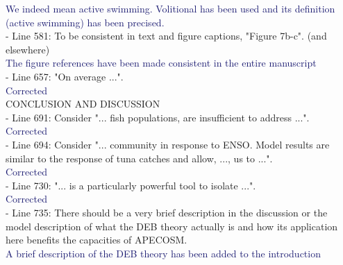 \documentclass[12pt]{article}
\newcommand{\resp}[1]{\textcolor{MidnightBlue}{#1}}
\begin{document}
\resp{We indeed mean active swimming. Volitional has been used and its definition (active swimming) has been precised.} \\

- Line 581: To be consistent in text and figure captions, "Figure 7b-c". (and elsewhere)\\

\resp{The figure references have been made consistent in the entire manuscript} \\

- Line 657: "On average ...".\\

\resp{Corrected} \\

CONCLUSION AND DISCUSSION\\

- Line 691: Consider "... fish populations, are insufficient to address ...".\\

\resp{Corrected}  \\

- Line 694: Consider "... community in response to ENSO. Model results are similar to the response of tuna catches and allow, ..., us to ...".\\

\resp{Corrected} \\

- Line 730: "... is a particularly powerful tool to isolate ...".\\

\resp{Corrected} \\

- Line 735: There should be a very brief description in the discussion or the model description of what the DEB theory actually is and how its application here benefits the capacities of APECOSM.\\

\resp{A brief description of the DEB theory has been added to the introduction}


\end{document}
